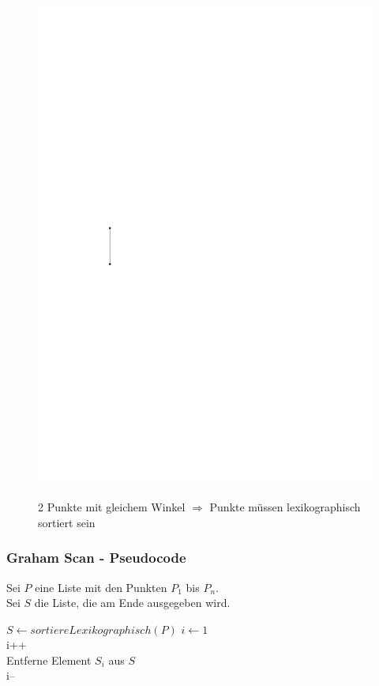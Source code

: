\begin{frame}
\begin{figure}[htbp]
\begin{minipage}[b]{.4\linewidth}
    \includegraphics[width=\linewidth]{bilder/sonderfall2}
    \\
    \\
    \tiny{2 Punkte mit gleichem Winkel $\Rightarrow$ Punkte müssen lexikographisch sortiert sein}
    \end{minipage}
\end{figure}


\end{frame}


\begin{frame}
	\frametitle{{Graham Scan - Pseudocode}}
	Sei $P$ eine Liste mit den Punkten $P_1$ bis $P_n$.\\
	Sei $S$ die Liste, die am Ende ausgegeben wird.
	\begin{algorithmic}
	\State $S \gets sortiereLexikographisch(P)$
	\State $i \gets 1$
		\\
			i++
		\Else \\
			Entferne Element $S_i$ aus $S$\\
			i--
		\EndIf
	\EndWhile
	\end{algorithmic}
\end{frame}


